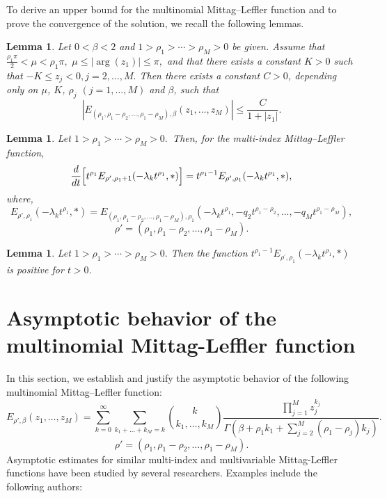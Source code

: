 \documentclass[12pt, reqno]{amsart}
\newtheorem{lemma}[theorem]{Lemma}
\theoremstyle{definition}
\theoremstyle{remark}
\numberwithin{equation}{section}
\begin{document}
To derive an upper bound for the multinomial Mittag–Leffler function and to prove the convergence of the solution, we recall the following lemmas.
\begin{lemma} \label{lem2}\cite{22} Let $0<\beta<2$ and
$1>\rho_1>\cdots>\rho_M>0$ be given. Assume that $\frac{\rho_1\pi}{2}<\mu<\rho_1\pi,\,\,
\mu \le |\arg(z_1)| \le \pi,
$
and that there exists a constant $K>0$ such that
$
-K \le z_j < 0, j=2,\dots,M.
$
Then there exists a constant $C>0$, depending only on $\mu$, $K$, $\rho_j$ $(j=1,\dots,M)$
and $\beta$, such that
\[
\left|
E_{(\rho_1,\rho_1-\rho_2,\dots,\rho_1-\rho_M),\beta}
(z_1,\dots,z_M)
\right|
\le
\frac{C}{1+|z_1|}.
\]
\end{lemma}
\begin{lemma}\label{lem3}\cite{22}
Let 
$
1>\rho_1>\cdots>\rho_M>0.
$
\,Then, for the multi-index Mittag--Leffler function,
\[
\frac{d}{dt} \Bigl[ t^{\rho_1} E_{\rho',\rho_1+1}(-\lambda_k t^{\rho_1},*) \Bigr]
= t^{\rho_1-1} E_{\rho',\rho_1}(-\lambda_k t^{\rho_1},*),
\]
where, 
$$
E_{\rho',\rho_1}(-\lambda_k t^{\rho_1},*)=E_{(\rho_1,\rho_1-\rho_2,...,\rho_1-\rho_M),\rho_1}(-\lambda_k t^{\rho_1},-q_2t^{\rho_1-\rho_2},...,-q_Mt^{\rho_1-\rho_M}),
$$
$$
\rho'=(\rho_1,\rho_1-\rho_2,...,\rho_1-\rho_M).
$$
\end{lemma}
\begin{lemma}\label{lem4}\cite{23} Let 
$
1>\rho_1>\cdots>\rho_M>0.
$ Then the function $t^{\rho_1-1} E_{\rho^{'},\rho_1}(-\lambda_k t^{\rho_1},*)$ is positive
for $t>0$.\\
\end{lemma}



\section{Asymptotic behavior of the multinomial Mittag-Leffler function}
\label{sec:3}
 In this section, we establish and justify the asymptotic behavior of the following multinomial Mittag--Leffler function:
\begin{equation}\label{3.1}
E_{\rho',\beta}(z_1,\ldots,z_M)
=
\sum_{k=0}^\infty
\sum_{k_1+\dots+k_M=k}
\binom{k}{k_1,\dots,k_M}
\frac{\prod_{j=1}^M z_j^{k_j}}{\Gamma\left(\beta+\rho_1k_1+\sum_{j=2}^M (\rho_1-\rho_j) k_j\right)}.
\end{equation}
\[
\rho' = (\rho_1, \rho_1 - \rho_2, \ldots, \rho_1 - \rho_M).
\]
Asymptotic estimates for similar multi-index and multivariable Mittag-Leffler functions have been studied by several researchers. Examples include the following authors:
\end{document}
